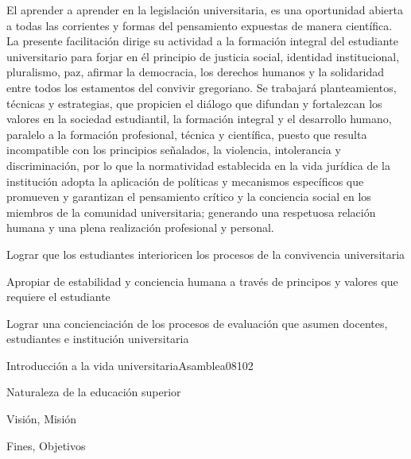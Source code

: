 \begin{syllabus}


\begin{justification}
El aprender a aprender en la legislación universitaria, es una oportunidad 
abierta a todas las corrientes y formas del pensamiento expuestas de manera 
científica. La presente facilitación dirige su actividad a la formación integral 
del estudiante universitario para forjar en él principio de justicia social, 
identidad institucional, pluralismo, paz, afirmar la democracia, los 
derechos humanos y la solidaridad entre todos los estamentos del convivir 
gregoriano. Se trabajará planteamientos, técnicas y estrategias, que 
propicien el diálogo que difundan y fortalezcan los valores en la 
sociedad estudiantil, la formación integral y el desarrollo humano, 
paralelo a la formación profesional, técnica y científica, puesto 
que resulta incompatible con los principios señalados, la violencia, 
intolerancia y discriminación, por lo que la normatividad establecida 
en la vida jurídica de la institución adopta la aplicación de políticas 
y mecanismos específicos que promueven y garantizan el pensamiento crítico 
y la conciencia social en los miembros de la comunidad universitaria; 
generando una respetuosa relación humana y una plena realización 
profesional y personal.
\end{justification}

\begin{goals}
\item Lograr que los estudiantes interioricen los procesos de la convivencia universitaria
\item Apropiar de estabilidad y conciencia humana a través de principos y valores que requiere el estudiante
\item Lograr una concienciación de los procesos de evaluación que asumen docentes, estudiantes e institución universitaria
\end{goals}

\begin{outcomes}
\end{outcomes}

\begin{unit}{Introducción a la vida universitaria}{Asamblea08}{10}{2}
   \begin{topics}
	\item Naturaleza de la educación superior
	\item Visión, Misión
	\item Fines, Objetivos
   \end{topics}


\end{unit}
\end{syllabus}
